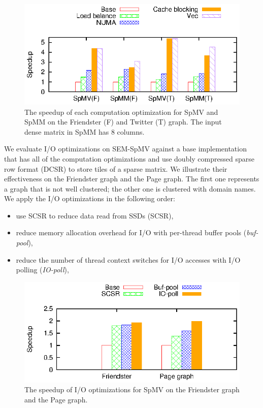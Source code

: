 \begin{figure}
	\begin{center}
		\footnotesize
		\includegraphics[scale=1]{SpMM_figs/SpMM_optimize.eps}
		\caption{The speedup of each computation optimization for SpMV and SpMM
			on the Friendster (F) and Twitter (T) graph. The input dense matrix
		in SpMM has 8 columns.}
		\label{perf:spmm_opt}
	\end{center}
\end{figure}

We evaluate I/O optimizations on SEM-SpMV against a base implementation that
has all of the computation optimizations and use doubly compressed sparse row
format (DCSR) to store tiles of a sparse matrix. We illustrate their
effectiveness on the Friendster graph and the Page graph. The first one
represents a graph that is not well clustered; the other one is clustered with
domain names. We apply the I/O optimizations in the following order:
\begin{itemize} \itemsep1pt \parskip0pt 
	\item use SCSR to reduce data read from SSDs (SCSR),
	\item reduce memory allocation overhead for I/O with per-thread buffer
		pools (\textit{buf-pool}),
	\item reduce the number of thread context switches for I/O accesses with I/O
		polling (\textit{IO-poll}),
\end{itemize}

\begin{figure}
	\begin{center}
		\footnotesize
		\includegraphics[scale=1]{SpMM_figs/io_opts.eps}
		\caption{The speedup of I/O optimizations for SpMV on the Friendster
		graph and the Page graph.}
		\label{perf:spmm_opt_io}
	\end{center}
\end{figure}

